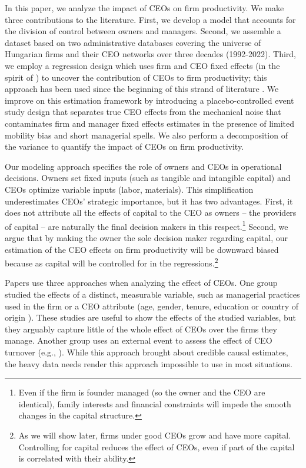 \documentclass[11pt,a4paper]{article}
\begin{document}
In this paper, we analyze the impact of CEOs on firm productivity. We make three contributions to the literature. First, we develop a model that accounts for the division of control between owners and managers. Second, we assemble a dataset based on two administrative databases covering the universe of Hungarian firms and their CEO networks over three decades (1992-2022). Third, we employ a regression design which uses firm and CEO fixed effects (in the spirit of \cite{abowd1999high}) to uncover the contribution of CEOs to firm productivity; this approach has been used since the beginning of this strand of literature \citep{Bertrand2003-io}. We improve on this estimation framework by introducing a placebo-controlled event study design that separates true CEO effects from the mechanical noise that contaminates firm and manager fixed effects estimates in the presence of limited mobility bias and short managerial spells. We also perform a decomposition of the variance to quantify the impact of CEOs on firm productivity.

Our modeling approach specifies the role of owners and CEOs in operational decisions. Owners set fixed inputs (such as tangible and intangible capital) and CEOs optimize variable inputs (labor, materials). This simplification underestimates CEOs' strategic importance, but it has two advantages. First, it does not attribute all the effects of capital to the CEO as owners -- the providers of capital -- are naturally the final decision makers in this respect.\footnote{Even if the firm is founder managed (so the owner and the CEO are identical), family interests and financial constraints will impede the smooth changes in the capital structure.} Second, we argue that by making the owner the sole decision maker regarding capital, our estimation of the CEO effects on firm productivity will be downward biased because as capital will be controlled for in the regressions.\footnote{As we will show later, firms under good CEOs grow and have more capital. Controlling for capital reduces the effect of CEOs, even if part of the capital is correlated with their ability.}

Papers use three approaches when analyzing the effect of CEOs. One group studied the effects of a distinct, measurable variable, such as managerial practices used in the firm \citep{bloom2012organization} or a CEO attribute (age, gender, tenure, education or country of origin \citep{anderson2018pathways, henderson2006quickly, Koren2023expat}). These studies are useful to show the effects of the studied variables, but they arguably capture little of the whole effect of CEOs over the firms they manage. Another group uses an external event to assess the effect of CEO turnover (e.g., \citet{bennedsen2020ceos}). While this approach brought about credible causal estimates, the heavy data needs render this approach impossible to use in most situations. 
\end{document}
